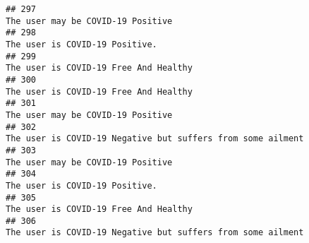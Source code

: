 \documentclass[
]{article}
\begin{document}
\begin{verbatim}
## 297                                                                                                                                                                                                                                  The user may be COVID-19 Positive
## 298                                                                                                                                                                                                                                     The user is COVID-19 Positive.
## 299                                                                                                                                                                                                                              The user is COVID-19 Free And Healthy
## 300                                                                                                                                                                                                                              The user is COVID-19 Free And Healthy
## 301                                                                                                                                                                                                                                  The user may be COVID-19 Positive
## 302                                                                                                                                                                                                        The user is COVID-19 Negative but suffers from some ailment
## 303                                                                                                                                                                                                                                  The user may be COVID-19 Positive
## 304                                                                                                                                                                                                                                     The user is COVID-19 Positive.
## 305                                                                                                                                                                                                                              The user is COVID-19 Free And Healthy
## 306                                                                                                                                                                                                        The user is COVID-19 Negative but suffers from some ailment

\end{verbatim}
\end{document}
